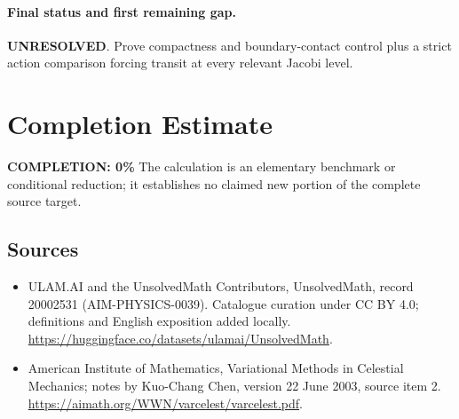 \documentclass[11pt]{article}
\begin{document}
\paragraph{Final status and first remaining gap.}
\textbf{UNRESOLVED}. Prove compactness and boundary-contact control plus a strict action comparison forcing transit at every relevant Jacobi level.

\section{Completion Estimate}
\noindent\textbf{COMPLETION: 0\%}
The calculation is an elementary benchmark or conditional reduction; it establishes no claimed new portion of the complete source target.

\subsection{Sources}
\begin{itemize}
\item[\hypertarget{source:20002531:1}{S1}] ULAM.AI and the UnsolvedMath Contributors, UnsolvedMath, record 20002531 (AIM-PHYSICS-0039). Catalogue curation under CC BY 4.0; definitions and English exposition added locally.
\url{https://huggingface.co/datasets/ulamai/UnsolvedMath}.
\item[\hypertarget{source:20002531:2}{S2}] American Institute of Mathematics, Variational Methods in Celestial Mechanics; notes by Kuo-Chang Chen, version 22 June 2003, source item 2.
\url{https://aimath.org/WWN/varcelest/varcelest.pdf}.
\end{itemize}
\label{end:20002531}
\end{document}
